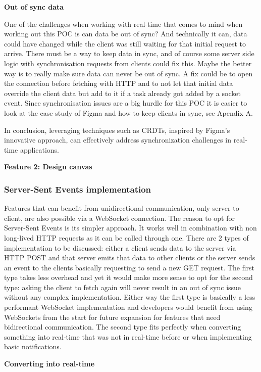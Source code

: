 \textbf{Out of sync data}

One of the challenges when working with real-time that comes to mind when working out this POC is can data be out of sync? And technically it can, data could have changed while the client was still waiting for that initial request to arrive. There must be a way to keep data in sync, and of course some server side logic with synchronisation requests from clients could fix this. Maybe the better way is to really make sure data can never be out of sync. A fix could be to open the connection before fetching with HTTP and to not let that initial data override the client data but add to it if a task already got added by a socket event. Since synchronisation issues are a big hurdle for this POC it is easier to look at the case study of Figma and how to keep clients in sync, see Apendix A.

In conclusion, leveraging techniques such as CRDTs, inspired by Figma's innovative approach, can effectively address synchronization challenges in real-time applications.

\textbf{Feature 2: Design canvas}


\subsubsection{Server-Sent Events implementation}

Features that can benefit from unidirectional communication, only server to client, are also possible via a WebSocket connection. The reason to opt for Server-Sent Events is its simpler approach. It works well in combination with non long-lived HTTP requests as it can be called through one. There are 2 types of implementation to be discussed: either a client sends data to the server via HTTP POST and that server emits that data to other clients or the server sends an event to the clients basically requesting to send a new GET request. The first type takes less overhead and yet it would make more sense to opt for the second type: asking the client to fetch again will never result in an out of sync issue without any complex implementation. Either way the first type is basically a less performant WebSocket implementation and developers would benefit from using WebSockets from the start for future expansion for features that need bidirectional communication. The second type fits perfectly when converting something into real-time that was not in real-time before or when implementing basic notifications.

\textbf{Converting into real-time}

